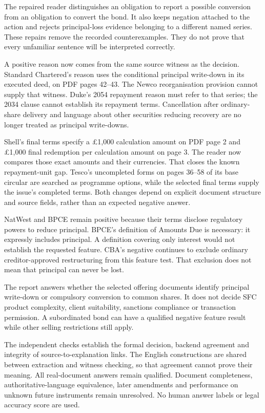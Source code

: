 \documentclass[
  11pt,
]{article}
\begin{document}
The repaired reader distinguishes an obligation to report a possible
conversion from an obligation to convert the bond. It also keeps
negation attached to the action and rejects principal-loss evidence
belonging to a different named series. These repairs remove the recorded
counterexamples. They do not prove that every unfamiliar sentence will
be interpreted correctly.

A positive reason now comes from the same source witness as the
decision. Standard Chartered's reason uses the conditional principal
write-down in its executed deed, on PDF pages 42--43. The Newco
reorganisation provision cannot supply that witness. Duke's 2054
repayment reason must refer to that series; the 2034 clause cannot
establish its repayment terms. Cancellation after ordinary-share
delivery and language about other securities reducing recovery are no
longer treated as principal write-downs.

Shell's final terms specify a £1,000 calculation amount on PDF page 2
and £1,000 final redemption per calculation amount on page 3. The reader
now compares those exact amounts and their currencies. That closes the
known repayment-unit gap. Tesco's uncompleted forms on pages 36--58 of
its base circular are searched as programme options, while the selected
final terms supply the issue's completed terms. Both changes depend on
explicit document structure and source fields, rather than an expected
negative answer.

NatWest and BPCE remain positive because their terms disclose regulatory
powers to reduce principal. BPCE's definition of Amounts Due is
necessary: it expressly includes principal. A definition covering only
interest would not establish the requested feature. CBA's negative
continues to exclude ordinary creditor-approved restructuring from this
feature test. That exclusion does not mean that principal can never be
lost.

The report answers whether the selected offering documents identify
principal write-down or compulsory conversion to common shares. It does
not decide SFC product complexity, client suitability, sanctions
compliance or transaction permission. A subordinated bond can have a
qualified negative feature result while other selling restrictions still
apply.

The independent checks establish the formal decision, backend agreement
and integrity of source-to-explanation links. The English constructions
are shared between extraction and witness checking, so that agreement
cannot prove their meaning. All real-document answers remain qualified.
Document completeness, authoritative-language equivalence, later
amendments and performance on unknown future instruments remain
unresolved. No human answer labels or legal accuracy score are used.
\end{document}
